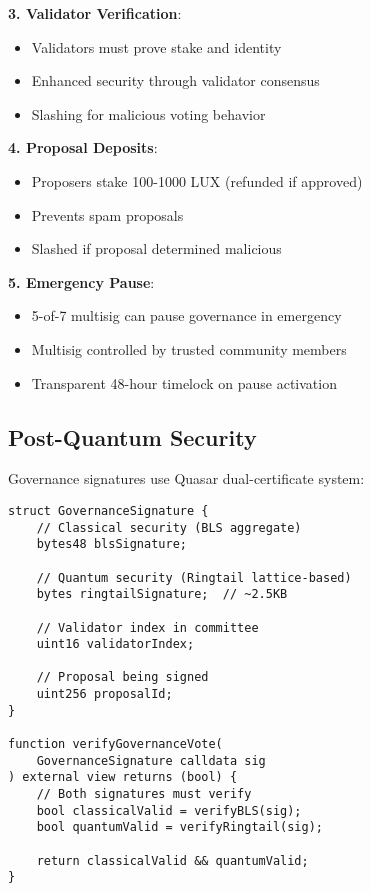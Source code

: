 \documentclass[11pt,a4paper]{article}
\begin{document}
\textbf{3. Validator Verification}:
\begin{itemize}
\item Validators must prove stake and identity
\item Enhanced security through validator consensus
\item Slashing for malicious voting behavior
\end{itemize}

\textbf{4. Proposal Deposits}:
\begin{itemize}
\item Proposers stake 100-1000 LUX (refunded if approved)
\item Prevents spam proposals
\item Slashed if proposal determined malicious
\end{itemize}

\textbf{5. Emergency Pause}:
\begin{itemize}
\item 5-of-7 multisig can pause governance in emergency
\item Multisig controlled by trusted community members
\item Transparent 48-hour timelock on pause activation
\end{itemize}

\subsection{Post-Quantum Security}

Governance signatures use Quasar dual-certificate system:

\begin{lstlisting}[language=Solidity,caption=Quantum-secure governance signature]
struct GovernanceSignature {
    // Classical security (BLS aggregate)
    bytes48 blsSignature;

    // Quantum security (Ringtail lattice-based)
    bytes ringtailSignature;  // ~2.5KB

    // Validator index in committee
    uint16 validatorIndex;

    // Proposal being signed
    uint256 proposalId;
}

function verifyGovernanceVote(
    GovernanceSignature calldata sig
) external view returns (bool) {
    // Both signatures must verify
    bool classicalValid = verifyBLS(sig);
    bool quantumValid = verifyRingtail(sig);

    return classicalValid && quantumValid;
}
\end{lstlisting}
\end{document}
